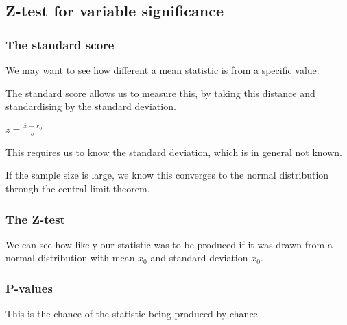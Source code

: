 
\subsection{Z-test for variable significance}

\subsubsection{The standard score}

We may want to see how different a mean statistic is from a specific value.

The standard score allows us to measure this, by taking this distance and standardising by the standard deviation.

\(z=\frac{\bar x-x_0}{\sigma }\)

This requires us to know the standard deviation, which is in general not known.

If the sample size is large, we know this converges to the normal distribution through the central limit theorem.

\subsubsection{The Z-test}

We can see how likely our statistic was to be produced if it was drawn from a normal distribution with mean \(x_0\) and standard deviation \(x_0\).

\subsubsection{P-values}

This is the chance of the statistic being produced by chance.

